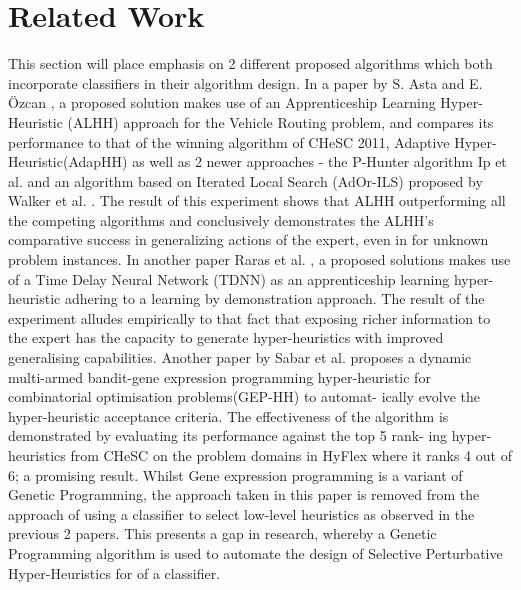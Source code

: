 \documentclass[a4paper,12pt]{article}
\begin{document}
\section{Related Work}  \label{sec:relwork}
    \par{
        This section will place emphasis on 2 different proposed algorithms 
        which both incorporate classifiers in their algorithm design.\newline 
        \newline 
        In a paper by S. Asta and E. Özcan \cite{astaozcan}, a proposed solution 
        makes use of an Apprenticeship Learning Hyper-Heuristic (ALHH) approach 
        for the Vehicle Routing problem, and compares its performance to that of 
        the winning algorithm of CHeSC 2011, Adaptive Hyper-Heuristic(AdapHH) as well 
        as 2 newer approaches - the P-Hunter algorithm Ip et al. \cite{phunter}   and an algorithm 
        based on Iterated Local Search (AdOr-ILS) proposed by Walker et al. \cite{ILS} . The result of 
        this experiment shows that ALHH outperforming all the competing algorithms and 
        conclusively demonstrates the ALHH’s comparative success in generalizing actions of 
        the expert, even in for unknown problem instances.\newline 
        \newline 
        In another paper Raras et al. \cite{tdnn} , a proposed solutions makes use of a Time Delay Neural
        Network (TDNN) as an apprenticeship learning hyper-heuristic adhering
        to a learning by demonstration approach. The result of the experiment alludes
        empirically to that fact that exposing richer information to the expert has the
        capacity to generate hyper-heuristics with improved generalising capabilities.
        Another paper by Sabar et al. \cite{gehh} proposes a dynamic multi-armed bandit-gene expression programming
        hyper-heuristic for combinatorial optimisation problems(GEP-HH) to automat-
        ically evolve the hyper-heuristic acceptance criteria. The effectiveness of the
        algorithm is demonstrated by evaluating its performance against the top 5 rank-
        ing hyper-heuristics from CHeSC on the problem domains in HyFlex where it
        ranks 4 out of 6; a promising result.\newline 
        \newline 
        Whilst Gene expression programming is a variant of Genetic Programming, the
        approach taken in this paper is removed from the approach of using a classifier to
        select low-level heuristics as observed in the previous 2 papers. This presents a
        gap in research, whereby a Genetic Programming algorithm is used to automate
        the design of Selective Perturbative Hyper-Heuristics for of a classifier.
    }
\end{document}
